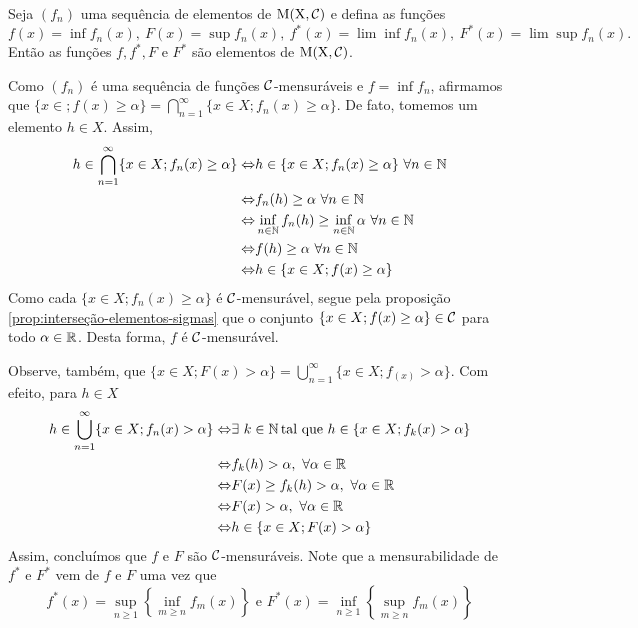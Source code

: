 \begin{theorem}
\label{teo:mensurabilidade-sequencia-funcoes-mensuraveis}
	Seja $(f_n)$ uma sequência de elementos de $\operatorname{M(X, \mathcal{C} )}$ e defina as funções
	$$f(x) = \inf f_n(x),\  
	F(x) = \sup f_n(x),\  
	f^*(x) = \lim\inf f_n(x),\   
	F^*(x) = \lim\sup f_n(x).$$
	Então as funções $f, f^*, F$ e $F^*$ são elementos de $\operatorname{M(X, \mathcal{C} )}$.
\end{theorem}
\begin{prova}
	Como $(f_n)$ é uma sequência de funções $\operatorname{\mathcal{C}}$-mensuráveis e $f = \inf f_n$, afirmamos que $\{x \in ; f(x) \geq \alpha\} = \displaystyle \bigcap_{n = 1}^\infty \{x \in X; f_n(x) \geq \alpha\}$.
	De fato, tomemos um elemento $h \in X$.
	Assim, 
		\begin{align*}
			h \in \bigcap_{n = 1}^\infty \{x \in X; f_n(x) \geq \alpha\} \Leftrightarrow	&
			h \in \{x \in X; f_n(x) \geq \alpha\}\ \forall n \in \operatorname{\mathbb{N}}\\
			\Leftrightarrow	&	
			f_n(h) \geq \alpha\ \forall n \in \operatorname{\mathbb{N}}\\
			\Leftrightarrow	&	
			\inf_{n \in \operatorname{\mathbb{N}}}f_n(h) \geq \inf_{n \in \operatorname{\mathbb{N}}}\alpha\ \forall n \in \operatorname{\mathbb{N}}\\
			\Leftrightarrow	&	
			f(h) \geq \alpha\ \forall n \in \operatorname{\mathbb{N}}\\
			\Leftrightarrow	&
			h \in \{x \in X; f(x) \geq \alpha\}
		\end{align*}
	Como cada $\{x \in X; f_n(x) \geq \alpha\}$ é $\operatorname{\mathcal{C}}$-mensurável, segue pela proposição \ref{prop:interseção-elementos-sigmas} que o conjunto $\{x \in X; f(x) \geq \alpha\} \in \operatorname{\mathcal{C}}$ para todo $\alpha \in \mathbb{R}$.
	Desta forma, $f$ é $\operatorname{\mathcal{C}}$-mensurável.
	
	Observe, também, que $\{x \in X; F(x) >\alpha\} = \displaystyle \bigcup_{n = 1}^\infty \{x \in X; f_(x) >\alpha\}$.
	Com efeito, para $h \in X$ 
	\begin{align*}
		h \in \bigcup_{n = 1}^\infty \{x \in X; f_n(x) > \alpha\} \Leftrightarrow	&
		\exists\ k \in \operatorname{\mathbb{N}} \textrm{tal que\ } h \in \{x \in X; f_k(x) > \alpha\}\\
		\Leftrightarrow	&	
		f_k(h) > \alpha,\ \forall \alpha \in \mathbb{R}\\
		\Leftrightarrow	&	
		F(x) \geq f_k(h) > \alpha,\ \forall \alpha \in \mathbb{R}\\
		\Leftrightarrow	&	
		F(x) > \alpha,\ \forall \alpha \in \mathbb{R}\\
		\Leftrightarrow	&
		h \in \{x \in X; F(x) > \alpha\}
	\end{align*}
	Assim, concluímos que $f$ e $F$ são $\operatorname{\mathcal{C}}$-mensuráveis. 
	Note que a mensurabilidade de $f^*$ e $F^*$ vem de $f$ e $F$ uma vez que
	$$
	f^*(x) = \sup_{n \geq 1} \left\{\inf_{m \geq n} f_m(x)\right\}
	\textrm{\ e\ }
	F^*(x) = \inf_{n \geq 1} \left\{\sup_{m \geq n} f_m(x)\right\}
	$$
\end{prova}

